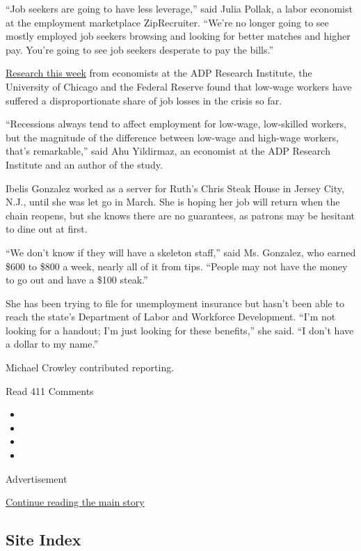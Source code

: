 ``Job seekers are going to have less leverage,'' said Julia Pollak, a
labor economist at the employment marketplace ZipRecruiter. ``We're no
longer going to see mostly employed job seekers browsing and looking for
better matches and higher pay. You're going to see job seekers desperate
to pay the bills.''

\href{https://bfi.uchicago.edu/wp-content/uploads/BFI_WP_202058-1.pdf}{Research
this week} from economists at the ADP Research Institute, the University
of Chicago and the Federal Reserve found that low-wage workers have
suffered a disproportionate share of job losses in the crisis so far.

``Recessions always tend to affect employment for low-wage, low-skilled
workers, but the magnitude of the difference between low-wage and
high-wage workers, that's remarkable,'' said Ahu Yildirmaz, an economist
at the ADP Research Institute and an author of the study.

Ibelis Gonzalez worked as a server for Ruth's Chris Steak House in
Jersey City, N.J., until she was let go in March. She is hoping her job
will return when the chain reopens, but she knows there are no
guarantees, as patrons may be hesitant to dine out at first.

``We don't know if they will have a skeleton staff,'' said Ms. Gonzalez,
who earned \$600 to \$800 a week, nearly all of it from tips. ``People
may not have the money to go out and have a \$100 steak.''

She has been trying to file for unemployment insurance but hasn't been
able to reach the state's Department of Labor and Workforce Development.
``I'm not looking for a handout; I'm just looking for these benefits,''
she said. ``I don't have a dollar to my name.''

Michael Crowley contributed reporting.

Read 411 Comments

\begin{itemize}
\item
\item
\item
\item
\end{itemize}

Advertisement

\protect\hyperlink{after-bottom}{Continue reading the main story}

\hypertarget{site-index}{%
\subsection{Site Index}\label{site-index}}

